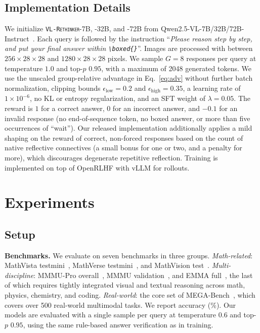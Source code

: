 \documentclass{article}
\newcommand{\model}{\texttt{\textsc{VL-Rethinker}}\xspace}
\begin{document}
\subsection{Implementation Details}
\label{sec:impl}

We initialize \model-7B, -32B, and -72B from Qwen2.5-VL-7B/32B/72B-Instruct~\cite{qwen2_5_vl}. Each query is followed by the instruction ``\textit{Please reason step by step, and put your final answer within \texttt{\textbackslash boxed\{\}}}''. Images are processed with between $256\times 28\times 28$ and $1280\times 28\times 28$ pixels. We sample $G=8$ responses per query at temperature $1.0$ and top-$p$ $0.95$, with a maximum of 2048 generated tokens. We use the unscaled group-relative advantage in Eq.~\eqref{eq:adv} without further batch normalization, clipping bounds $\epsilon_\text{low}=0.2$ and $\epsilon_\text{high}=0.35$, a learning rate of $1\times10^{-6}$, no KL or entropy regularization, and an SFT weight of $\lambda=0.05$. The reward is $1$ for a correct answer, $0$ for an incorrect answer, and $-0.1$ for an invalid response (no end-of-sequence token, no boxed answer, or more than five occurrences of ``wait''). Our released implementation additionally applies a mild shaping on the reward of correct, non-forced responses based on the count of native reflective connectives (a small bonus for one or two, and a penalty for more), which discourages degenerate repetitive reflection. Training is implemented on top of OpenRLHF with vLLM for rollouts.

\section{Experiments}
\label{sec:exp}

\subsection{Setup}

\textbf{Benchmarks.} We evaluate on seven benchmarks in three groups. \emph{Math-related}: MathVista testmini~\cite{mathvista}, MathVerse testmini~\cite{mathverse}, and MathVision test~\cite{mathvision}. \emph{Multi-discipline}: MMMU-Pro overall~\cite{mmmupro}, MMMU validation~\cite{yue2024mmmu}, and EMMA full~\cite{emma}, the last of which requires tightly integrated visual and textual reasoning across math, physics, chemistry, and coding. \emph{Real-world}: the core set of MEGA-Bench~\cite{chen2024mega}, which covers over 500 real-world multimodal tasks. We report accuracy (\%). Our models are evaluated with a single sample per query at temperature $0.6$ and top-$p$ $0.95$, using the same rule-based answer verification as in training.
\end{document}
